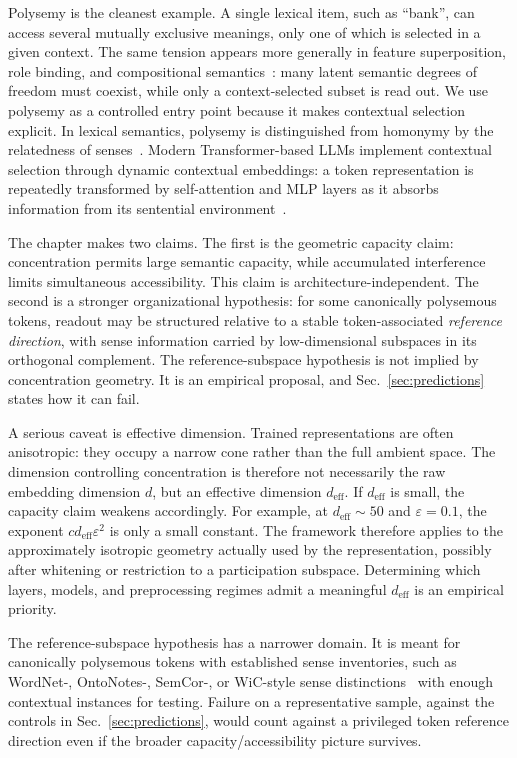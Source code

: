\documentclass[
  aps,
  reprint,
  superscriptaddress,
  floatfix,
  nofootinbib,
  longbibliography
]{revtex4-2}
\newcommand{\deff}{d_{\mathrm{eff}}}
\begin{document}
Polysemy is the cleanest example. A single lexical item, such as
``bank'', can access several mutually exclusive meanings, only one of
which is selected in a given context. The same tension appears more
generally in feature superposition, role binding, and compositional
semantics~\cite{mikolov2013}: many latent semantic degrees of freedom
must coexist, while only a context-selected subset is read out. We use
polysemy as a controlled entry point because it makes contextual
selection explicit. In lexical semantics, polysemy is distinguished
from homonymy by the relatedness of senses~\cite{pustejovsky1995}.
Modern Transformer-based LLMs implement contextual selection through
dynamic contextual embeddings: a token representation is repeatedly
transformed by self-attention and MLP layers as it absorbs information
from its sentential environment~\cite{Vaswani-2017-Attention}.

The chapter makes two claims. The first is the geometric capacity claim:
concentration permits large semantic capacity, while accumulated
interference limits simultaneous accessibility. This claim is
architecture-independent. The second is a stronger organizational
hypothesis: for some canonically polysemous tokens, readout may be
structured relative to a stable token-associated \emph{reference direction},
with sense information carried by low-dimensional subspaces in its
orthogonal complement. The reference-subspace hypothesis is not implied by
concentration geometry. It is an empirical proposal, and
Sec.~\ref{sec:predictions} states how it can fail.

A serious caveat is effective dimension. Trained representations are
often anisotropic: they occupy a narrow cone rather than the full
ambient space. The dimension controlling concentration is therefore
not necessarily the raw embedding dimension $d$, but an effective
dimension $\deff$. If $\deff$ is small, the capacity claim weakens
accordingly. For example, at $\deff\sim 50$ and $\varepsilon=0.1$, the
exponent $c\deff\varepsilon^{2}$ is only a small constant. The framework
therefore applies to the approximately isotropic geometry actually used
by the representation, possibly after whitening or restriction to a
participation subspace. Determining which layers, models, and
preprocessing regimes admit a meaningful $\deff$ is an empirical
priority.

The reference-subspace hypothesis has a narrower domain. It is meant for
canonically polysemous tokens with established sense inventories, such
as WordNet-, OntoNotes-, SemCor-, or WiC-style sense
distinctions~\cite{pilehvar2019wic} with enough contextual instances
for testing. Failure on a representative sample, against the controls
in Sec.~\ref{sec:predictions}, would count against a privileged token
reference direction even
if the broader capacity/accessibility picture survives.
\end{document}
